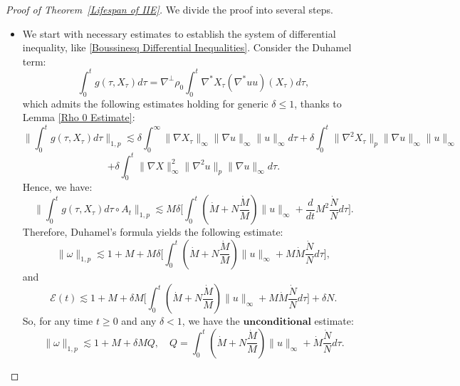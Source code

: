 \documentclass[10pt,a4paper]{amsart}
\begin{document}
\begin{proof}[Proof of Theorem~\ref{Lifespan of IIE}]
We divide the proof into several steps.
\begin{itemize}
    \item [(I)] We start with necessary estimates to establish the system of differential inequality, like \eqref{Boussinesq Differential Inequalities}. Consider the Duhamel term:
\begin{equation*}
\int_0^t g(\tau,X_\tau)d\tau=\nabla^\perp\rho_0 \int_0^t \nabla^* X_\tau (\nabla^* uu)(X_\tau)d\tau,
\end{equation*}
which admits the following estimates holding for generic $\delta\le 1$, thanks to Lemma \ref{Rho 0 Estimate}:
\begin{equation*}
 \bigg\lVert  \int_0^t g(\tau,X_\tau)d\tau \bigg\rVert_{1,p}\lesssim  \delta\int_0^\infty \lVert \nabla X_\tau\rVert_\infty \lVert\nabla u\rVert_\infty \lVert u\rVert_\infty d\tau+\delta  \int_0^t\lVert\nabla^2 X_\tau\rVert_p \lVert\nabla u\rVert_\infty \lVert u\rVert_\infty
\end{equation*}
\begin{equation*}
 +\delta\int_0^t\lVert\nabla X\rVert_\infty^2 \lVert\nabla^2 u\rVert_p\lVert \nabla u\rVert_\infty d\tau .  
\end{equation*}
Hence, we have:
\begin{equation*}
  \bigg\lVert  \int_0^t g(\tau,X_\tau)d\tau \circ A_t\bigg\rVert_{1,p} \lesssim  M\delta\Big[\int_0^t (\dot M+N\frac{\dot M}{M})\lVert u\rVert_\infty+\frac{d}{dt}M^2 \frac{\dot N}{N}d\tau
  \Big].
\end{equation*}
Therefore, Duhamel's formula yields the following estimate:
\begin{equation*}
 \lVert\omega\rVert_{1,p}\lesssim 1+M+  M\delta\Big[\int_0^t (\dot M+N\frac{\dot M}{M})\lVert u\rVert_\infty+M\dot M \frac{\dot N}{N}d\tau\Big],
\end{equation*}
and 
\begin{equation}\label{Energy norm of IIE}
\mathcal E(t)\lesssim  1+M +\delta M\Big[\int_0^t (\dot M+N\frac{\dot M}{M})\lVert u\rVert_\infty+M\dot M \frac{\dot N}{N}d\tau\Big]+\delta N.
\end{equation}
So, for any time $t\ge 0$ and any $\delta<1$, we have the $\mathbf{unconditional}$ estimate:
\begin{equation}\label{unconditional Duhamel estimate}
    \lVert\omega\rVert_{1,p}\lesssim 1+M+  \delta MQ,\quad Q=\int_0^t (\dot M+N\frac{\dot M}{M})\lVert u\rVert_\infty+\dot M \frac{\dot N}{N}d\tau .

\end{equation}
\end{itemize}
\end{proof}
\end{document}

